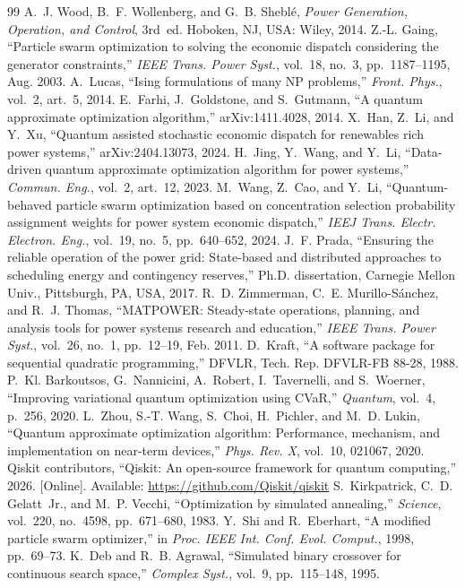 \documentclass[conference]{IEEEtran}
\begin{document}
\begin{thebibliography}{99}
 A.~J. Wood, B.~F. Wollenberg, and G.~B. Sheblé, \emph{Power Generation, Operation, and Control}, 3rd~ed. Hoboken, NJ, USA: Wiley, 2014.
 Z.-L. Gaing, ``Particle swarm optimization to solving the economic dispatch considering the generator constraints,'' \emph{IEEE Trans. Power Syst.}, vol.~18, no.~3, pp.~1187--1195, Aug. 2003.
 A.~Lucas, ``Ising formulations of many NP problems,'' \emph{Front. Phys.}, vol.~2, art.~5, 2014.
 E.~Farhi, J.~Goldstone, and S.~Gutmann, ``A quantum approximate optimization algorithm,'' arXiv:1411.4028, 2014.
 X.~Han, Z.~Li, and Y.~Xu, ``Quantum assisted stochastic economic dispatch for renewables rich power systems,'' arXiv:2404.13073, 2024.
 H.~Jing, Y.~Wang, and Y.~Li, ``Data-driven quantum approximate optimization algorithm for power systems,'' \emph{Commun. Eng.}, vol.~2, art.~12, 2023.
 M.~Wang, Z.~Cao, and Y.~Li, ``Quantum-behaved particle swarm optimization based on concentration selection probability assignment weights for power system economic dispatch,'' \emph{IEEJ Trans. Electr. Electron. Eng.}, vol.~19, no.~5, pp.~640--652, 2024.
 J.~F. Prada, ``Ensuring the reliable operation of the power grid: State-based and distributed approaches to scheduling energy and contingency reserves,'' Ph.D. dissertation, Carnegie Mellon Univ., Pittsburgh, PA, USA, 2017.
 R.~D. Zimmerman, C.~E. Murillo-Sánchez, and R.~J. Thomas, ``MATPOWER: Steady-state operations, planning, and analysis tools for power systems research and education,'' \emph{IEEE Trans. Power Syst.}, vol.~26, no.~1, pp.~12--19, Feb. 2011.
 D.~Kraft, ``A software package for sequential quadratic programming,'' DFVLR, Tech. Rep. DFVLR-FB 88-28, 1988.
 P.~Kl. Barkoutsos, G.~Nannicini, A.~Robert, I.~Tavernelli, and S.~Woerner, ``Improving variational quantum optimization using CVaR,'' \emph{Quantum}, vol.~4, p.~256, 2020.
 L.~Zhou, S.-T. Wang, S.~Choi, H.~Pichler, and M.~D. Lukin, ``Quantum approximate optimization algorithm: Performance, mechanism, and implementation on near-term devices,'' \emph{Phys. Rev. X}, vol.~10, 021067, 2020.
 Qiskit contributors, ``Qiskit: An open-source framework for quantum computing,'' 2026. [Online]. Available: \url{https://github.com/Qiskit/qiskit}
 S.~Kirkpatrick, C.~D. Gelatt~Jr., and M.~P. Vecchi, ``Optimization by simulated annealing,'' \emph{Science}, vol.~220, no.~4598, pp.~671--680, 1983.
 Y.~Shi and R.~Eberhart, ``A modified particle swarm optimizer,'' in \emph{Proc. IEEE Int. Conf. Evol. Comput.}, 1998, pp.~69--73.
 K.~Deb and R.~B. Agrawal, ``Simulated binary crossover for continuous search space,'' \emph{Complex Syst.}, vol.~9, pp.~115--148, 1995.
\end{thebibliography}
\end{document}
